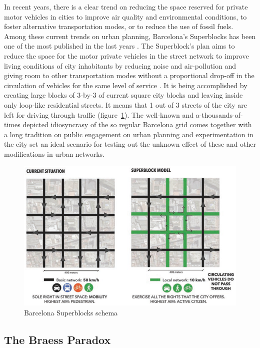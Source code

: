 \documentclass[11pt]{article}
\begin{document}
In recent years, there is a clear trend on reducing the space reserved for private motor vehicles in cities to improve air quality and environmental conditions, to foster alternative transportation modes, or to reduce the use of fossil fuels. Among these current trends on urban planning, Barcelona's Superblocks has been one of the most published in the last years \citep{Bausells2016, Hu2016, Morel2019, Wiedeman2018}. The Superblock's plan aims to reduce the space for the motor private vehicles in the street network to improve living conditions of city inhabitants by reducing noise and air-pollution and giving room to other transportation modes without a proportional drop-off in the circulation of vehicles for the same level of service \citep{Rueda2018}. It is being accomplished by creating large blocks of 3-by-3 of current square city blocks and leaving inside only loop-like residential streets. It means that 1 out of 3 streets of the city are left for driving through traffic (figure~\ref{fig:Barcelona Superblocks schema}). The well-known and a-thousands-of-times depicted idiosyncrasy of the so regular Barcelona grid comes together with a long tradition on public engagement on urban planning and experimentation in the city set an ideal scenario for testing out the unknown effect of these and other modifications in urban networks.

\begin{figure}[h]
\centering
\includegraphics[scale=0.48]{bcn_superblocks_rueda_2018.png}
\caption{Barcelona Superblocks schema \citep{Rueda2018}}
\label{fig:Barcelona Superblocks schema}
\end{figure}

\subsection {The Braess Paradox}
\end{document}
